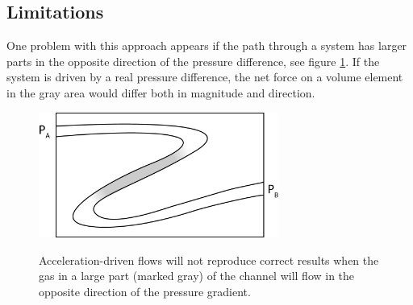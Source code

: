 \subsection{Limitations}
One problem with this approach appears if the path through a system has larger parts in the opposite direction of the pressure difference, see figure \ref{fig:gravity_problem}. If the system is driven by a real pressure difference, the net force on a volume element in the gray area would differ both in magnitude and direction.
\begin{figure}[h]
\begin{center}
\includegraphics[width=0.7\textwidth, trim=0cm 0cm 0cm 0cm, clip]{DSMC/figures/gravity_problem.eps}
\label{fig:gravity_problem}
\end{center}
\caption{Acceleration-driven flows will not reproduce correct results when the gas in a large part (marked gray) of the channel will flow in the opposite direction of the pressure gradient.}
\end{figure}

